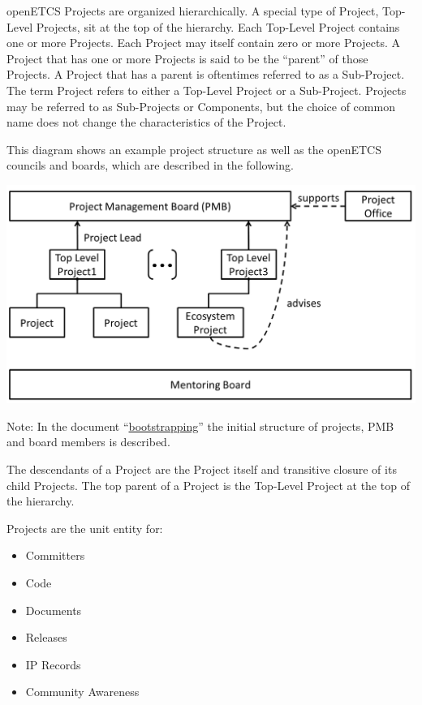 openETCS Projects are organized hierarchically. A special type of
Project, Top-Level Projects, sit at the top of the hierarchy. Each
Top-Level Project contains one or more Projects. Each Project may itself
contain zero or more Projects. A Project that has one or more Projects
is said to be the ``parent'' of those Projects. A Project that has a
parent is oftentimes referred to as a Sub-Project. The term Project
refers to either a Top-Level Project or a Sub-Project. Projects may be
referred to as Sub-Projects or Components, but the choice of common name
does not change the characteristics of the Project.

This diagram shows an example project structure as well as the openETCS
councils and boards, which are described in the following.

\includegraphics[width=\linewidth]{images/projectstructure.png}


Note: In the document ``\href{Process-Bootstrapping}{bootstrapping}''
the initial structure of projects, PMB and board members is described.

The descendants of a Project are the Project itself and transitive
closure of its child Projects. The top parent of a Project is the
Top-Level Project at the top of the hierarchy.

Projects are the unit entity for:

\begin{itemize}

\item
  Committers
\item
  Code
\item
  Documents
\item
  Releases
\item
  IP Records
\item
  Community Awareness
\end{itemize}

